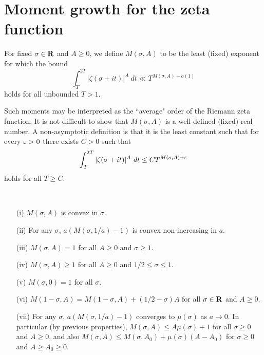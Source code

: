 \chapter{Moment growth for the zeta function}\label{zeta-moment-chapter}

\begin{definition}\label{zeta-moment-def}  For fixed $\sigma \in \mathbf{R}$ and $A \geq 0$, we define $M(\sigma,A)$ to be the least (fixed) exponent for which the bound
$$ \int_T^{2T} |\zeta(\sigma+it)|^A\ dt \ll T^{M(\sigma,A)+o(1)}$$
holds for all unbounded $T > 1$.
\end{definition}

Such moments may be interpreted as the ``average" order of the Riemann zeta function. It is not difficult to show that $M(\sigma,A)$ is a well-defined (fixed) real number.  A non-asymptotic definition is that it is the least constant such that for every $\varepsilon>0$ there exists $C>0$ such that
$$ \int_T^{2T} |\zeta(\sigma+it)|^A\ dt \leq C T^{M(\sigma,A)+\eps}$$
holds for all $T \geq C$.

\begin{lemma}\label{zeta-moment-basic}\
\begin{itemize}
\item[(i)] $M(\sigma,A)$ is convex in $\sigma$.
\item[(ii)] For any $\sigma$, $a (M(\sigma,1/a)-1)$ is convex non-increasing in $a$.
\item[(iii)] $M(\sigma,A)=1$ for all $A \geq 0$ and $\sigma \geq 1$.
\item[(iv)] $M(\sigma,A) \geq 1$ for all $A \geq 0$ and $1/2 \leq \sigma \leq 1$.
\item[(v)] $M(\sigma,0) = 1$ for all $\sigma$.
\item[(vi)] $M(1-\sigma,A) = M(1-\sigma,A) + (1/2-\sigma) A$ for all $\sigma \in \mathbf{R}$ and $A \geq 0$.
\item[(vii)] For any $\sigma$, $a(M(\sigma,1/a)-1)$ converges to $\mu(\sigma)$ as $a \to 0$.  In particular (by previous properties), $M(\sigma,A) \leq A \mu(\sigma) + 1$ for all $\sigma \geq 0$ and $A \geq 0$, and also $M(\sigma,A) \leq M(\sigma,A_0) + \mu(\sigma)(A-A_0)$ for $\sigma \geq 0$ and $A \geq A_0 \geq 0$.
\end{itemize}
\end{lemma}

